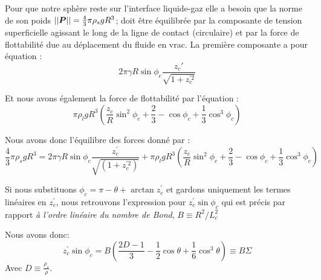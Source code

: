     Pour que notre sphère reste sur l'interface liquide-gaz elle a besoin que la norme de son poids \(||\vb*{P}||=\frac{4}{3}\pi\rho_{s}gR^3\); doit être équilibrée par la composante de tension superficielle agissant le long de la ligne de contact (circulaire) et par la force de flottabilité due au déplacement du fluide en vrac. La première composante a pour équation :
    \begin{equation}
        2\pi\gamma R\sin{\phi_c}\frac{z_c'}{\sqrt{1+z_c^{'2}}}
    \end{equation}

    Et nous avons également la force de flottabilité par l'équation :
    \begin{equation}
        \pi\rho_l g R^3 (\frac{z_c}{R}\sin^2{\phi_c} + \frac{2}{3}-\cos{\phi_c}+\frac{1}{3}\cos^3{\phi_c})
        \label{eq:buoyancyForce}
    \end{equation}


    Nous avons donc l'équilibre des forces donné par :
    \begin{equation}
        \frac{4}{3}\pi\rho_{s}gR^3 =2\pi\gamma R \sin\phi_c \frac{z_c^{'}}{\sqrt{(1+z_c^{'2})}} + \pi\rho_l g R^3 (\frac{z_c}{R}\sin^2 \phi_c + \frac{2}{3}-\cos\phi_c+\frac{1}{3}\cos^3 \phi_c)
    \end{equation}


    Si nous substituons \(\phi_c = \pi - \theta + \arctan z_c^{'}\) et gardons uniquement les termes linéaires en \(z_c^{'}\), nous retrouvons l'expression pour \(z_c^{'}\sin \phi_c\) qui est précis par rapport \textit{à l'ordre linéaire du nombre de Bond}, \(B \equiv R^2/L_c^2\) 

    Nous avons donc:
    \begin{equation}
        z_c^{'}\sin \phi_c = B(\frac{2D-1}{3}-\frac{1}{2}\cos \theta + \frac{1}{6} \cos^3 \theta) \equiv B\Sigma
        \label{eq:bondsigma}
    \end{equation}
    Avec \(D \equiv \frac{\rho_s}{\rho}\).
    

